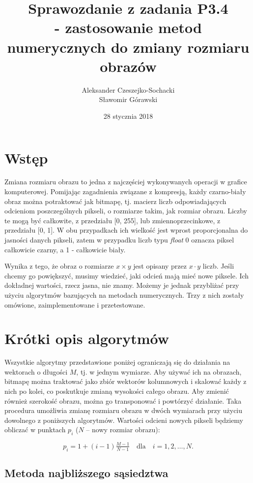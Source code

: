 \documentclass{article}
\title{Sprawozdanie z zadania P3.4\\- zastosowanie metod numerycznych do zmiany rozmiaru obrazów}
\author{Aleksander Czeszejko-Sochacki\\Sławomir Górawski}
\date{28 stycznia 2018}
\begin{document}
\maketitle

\section{Wstęp}

Zmiana rozmiaru obrazu to jedna z najczęściej wykonywanych operacji w grafice komputerowej. Pomijając zagadnienia związane z kompresją, każdy czarno-biały obraz można potraktować jak bitmapę, tj. macierz liczb odpowiadających odcieniom poszczególnych pikseli, o rozmiarze takim, jak rozmiar obrazu. Liczby te mogą być całkowite, z przedziału [0, 255], lub zmiennoprzecinkowe, z przedziału [0, 1]. W obu przypadkach ich wielkość jest wprost proporcjonalna do jasności danych pikseli, zatem w przypadku liczb typu \textit{float} 0 oznacza piksel całkowicie czarny, a 1 - całkowicie biały.

Wynika z tego, że obraz o rozmiarze $x\times y$ jest opisany przez $x\cdot y$ liczb. Jeśli chcemy go powiększyć, musimy wiedzieć, jaki odcień mają mieć nowe piksele. Ich dokładnej wartości, rzecz jasna, nie znamy. Możemy je jednak przybliżać przy użyciu algorytmów bazujących na metodach numerycznych. Trzy z nich zostały omówione, zaimplementowane i przetestowane.

\section{Krótki opis algorytmów}

Wszystkie algorytmy przedstawione poniżej ograniczają się do działania na wektorach o długości $M$, tj. w jednym wymiarze. Aby używać ich na obrazach, bitmapę można traktować jako zbiór wektorów kolumnowych i skalować każdy z nich po kolei, co poskutkuje zmianą wysokości całego obrazu. Aby zmienić również szerokość obrazu, można go transponować i powtórzyć działanie. Taka procedura umożliwia zmianę rozmiaru obrazu w dwóch wymiarach przy użyciu dowolnego z poniższych algorytmów. Wartości odcieni nowych pikseli będziemy obliczać w punktach $p_i$ ($N$ -- nowy rozmiar obrazu):

$$p_i = 1 + (i - 1)\tfrac{M-1}{N-1} \quad \text{dla} \quad i = 1, 2, \dots, N.$$

\subsection{Metoda najbliższego sąsiedztwa}
\end{document}
